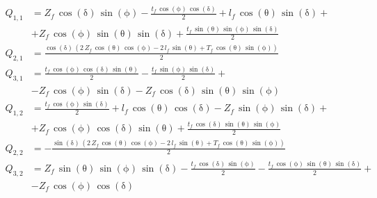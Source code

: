 \begin{align*}
Q_{1,1}&=Z_{f}\,\cos\left(\mathrm{\delta}\right)\,\sin\left(\mathrm{\phi}\right)-\frac{t_{f}\,\cos\left(\mathrm{\phi}\right)\,\cos\left(\mathrm{\delta}\right)}{2}+l_{f}\,\cos\left(\mathrm{\theta}\right)\,\sin\left(\mathrm{\delta}\right)+\\&+Z_{f}\,\cos\left(\mathrm{\phi}\right)\,\sin\left(\mathrm{\theta}\right)\,\sin\left(\mathrm{\delta}\right)+\frac{t_{f}\,\sin\left(\mathrm{\theta}\right)\,\sin\left(\mathrm{\phi}\right)\,\sin\left(\mathrm{\delta}\right)}{2}\\
Q_{2,1}&=\frac{\cos\left(\mathrm{\delta}\right)\,\left(2\,Z_{f}\,\cos\left(\mathrm{\theta}\right)\,\cos\left(\mathrm{\phi}\right)-2\,l_{f}\,\sin\left(\mathrm{\theta}\right)+T_{f}\,\cos\left(\mathrm{\theta}\right)\,\sin\left(\mathrm{\phi}\right)\right)}{2}\\
Q_{3,1}&=\frac{t_{f}\,\cos\left(\mathrm{\phi}\right)\,\cos\left(\mathrm{\delta}\right)\,\sin\left(\mathrm{\theta}\right)}{2}-\frac{t_{f}\,\sin\left(\mathrm{\phi}\right)\,\sin\left(\mathrm{\delta}\right)}{2}+\\&-Z_{f}\,\cos\left(\mathrm{\phi}\right)\,\sin\left(\mathrm{\delta}\right)-Z_{f}\,\cos\left(\mathrm{\delta}\right)\,\sin\left(\mathrm{\theta}\right)\,\sin\left(\mathrm{\phi}\right)\\
Q_{1,2}&=\frac{t_{f}\,\cos\left(\mathrm{\phi}\right)\,\sin\left(\mathrm{\delta}\right)}{2}+l_{f}\,\cos\left(\mathrm{\theta}\right)\,\cos\left(\mathrm{\delta}\right)-Z_{f}\,\sin\left(\mathrm{\phi}\right)\,\sin\left(\mathrm{\delta}\right)+\\&+Z_{f}\,\cos\left(\mathrm{\phi}\right)\,\cos\left(\mathrm{\delta}\right)\,\sin\left(\mathrm{\theta}\right)+\frac{t_{f}\,\cos\left(\mathrm{\delta}\right)\,\sin\left(\mathrm{\theta}\right)\,\sin\left(\mathrm{\phi}\right)}{2}\\
Q_{2,2}&=-\frac{\sin\left(\mathrm{\delta}\right)\,\left(2\,Z_{f}\,\cos\left(\mathrm{\theta}\right)\,\cos\left(\mathrm{\phi}\right)-2\,l_{f}\,\sin\left(\mathrm{\theta}\right)+T_{f}\,\cos\left(\mathrm{\theta}\right)\,\sin\left(\mathrm{\phi}\right)\right)}{2}\\
Q_{3,2}&=Z_{f}\,\sin\left(\mathrm{\theta}\right)\,\sin\left(\mathrm{\phi}\right)\,\sin\left(\mathrm{\delta}\right)-\frac{t_{f}\,\cos\left(\mathrm{\delta}\right)\,\sin\left(\mathrm{\phi}\right)}{2}-\frac{t_{f}\,\cos\left(\mathrm{\phi}\right)\,\sin\left(\mathrm{\theta}\right)\,\sin\left(\mathrm{\delta}\right)}{2}+\\&-Z_{f}\,\cos\left(\mathrm{\phi}\right)\,\cos\left(\mathrm{\delta}\right)\\

\end{align*}
